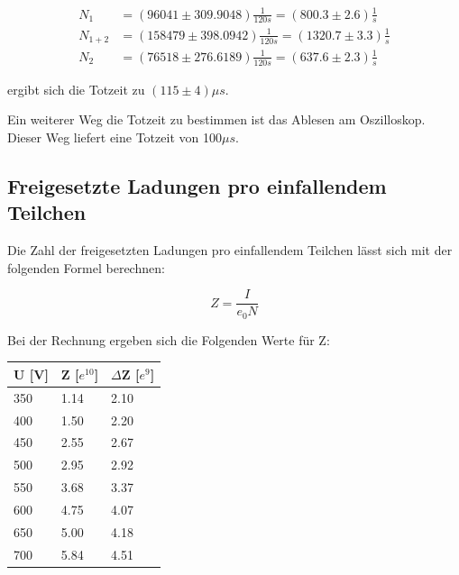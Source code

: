 \begin{align}
    N_1 &= (96041 \pm 309.9048) \frac{1}{120s} = (800.3 \pm 2.6) \frac{1}{s} \nonumber \\
    N_{1+2} &= (158479 \pm 398.0942) \frac{1}{120s} = (1320.7 \pm 3.3) \frac{1}{s} \nonumber \\
    N_2 &= (76518 \pm 276.6189) \frac{1}{120s} = (637.6 \pm 2.3) \frac{1}{s} \nonumber
\end{align}

\noindent ergibt  sich die Totzeit zu $(115 \pm 4)\mu s$.

\noindent Ein weiterer Weg die Totzeit zu bestimmen ist das Ablesen am Oszilloskop.
Dieser Weg liefert eine Totzeit von 100$\mu s$.

\subsection{Freigesetzte Ladungen pro einfallendem Teilchen}

Die Zahl der freigesetzten Ladungen pro einfallendem Teilchen lässt sich mit der folgenden Formel berechnen:

\begin{displaymath}
    Z = \frac{I}{e_0N}
\end{displaymath}

\noindent Bei der Rechnung ergeben sich die Folgenden Werte für Z:

\begin{minipage}{\linewidth}
    \begin{table}[H]
        \centering
    
    \begin{tabular}{ll@{${}\pm{}$}l}
        \toprule
        U [V] & Z [$e^{10}$] & $\Delta$Z [$e^{9}$]\\
        \midrule
        350 & 1.14 & 2.10 \\
        400 & 1.50 & 2.20 \\
        450 & 2.55 & 2.67 \\
        500 & 2.95 & 2.92 \\
        550 & 3.68 & 3.37 \\
        600 & 4.75 & 4.07 \\
        650 & 5.00 & 4.18 \\
        700 & 5.84 & 4.51 \\
        \bottomrule
        
    \end{tabular}
    \label{tab:7d}
    \end{table}
\end{minipage}

